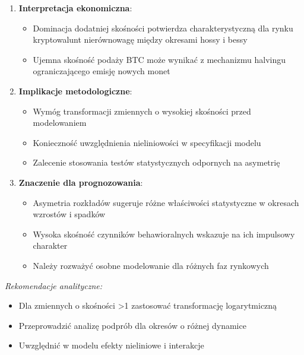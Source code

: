\documentclass[
  11pt,
]{article}
\providecommand{\tightlist}{%
  \setlength{\itemsep}{0pt}\setlength{\parskip}{0pt}}
\begin{document}
\begin{enumerate}
\def\labelenumi{\arabic{enumi}.}
\tightlist
\item
  \textbf{Interpretacja ekonomiczna}: \vspace{0.2cm}

  \begin{itemize}
  \tightlist
  \item
    Dominacja dodatniej skośności potwierdza charakterystyczną dla rynku
    kryptowalunt nierównowagę między okresami hossy i bessy
  \item
    Ujemna skośność podaży BTC może wynikać z mechanizmu halvingu
    ograniczającego emisję nowych monet
  \end{itemize}
\item
  \textbf{Implikacje metodologiczne}: \vspace{0.2cm}

  \begin{itemize}
  \tightlist
  \item
    Wymóg transformacji zmiennych o wysokiej skośności przed
    modelowaniem
  \item
    Konieczność uwzględnienia nieliniowości w specyfikacji modelu
  \item
    Zalecenie stosowania testów statystycznych odpornych na asymetrię
  \end{itemize}
\item
  \textbf{Znaczenie dla prognozowania}: \vspace{0.2cm}

  \begin{itemize}
  \tightlist
  \item
    Asymetria rozkładów sugeruje różne właściwości statystyczne w
    okresach wzrostów i spadków
  \item
    Wysoka skośność czynników behawioralnych wskazuje na ich impulsowy
    charakter
  \item
    Należy rozważyć osobne modelowanie dla różnych faz rynkowych
  \end{itemize}
\end{enumerate}

\vspace{0.3cm}

\textit{Rekomendacje analityczne:}

\begin{itemize}
\item Dla zmiennych o skośności >1 zastosować transformację logarytmiczną
\item Przeprowadzić analizę podprób dla okresów o różnej dynamice
\item Uwzględnić w modelu efekty nieliniowe i interakcje
\end{itemize}
\end{document}
